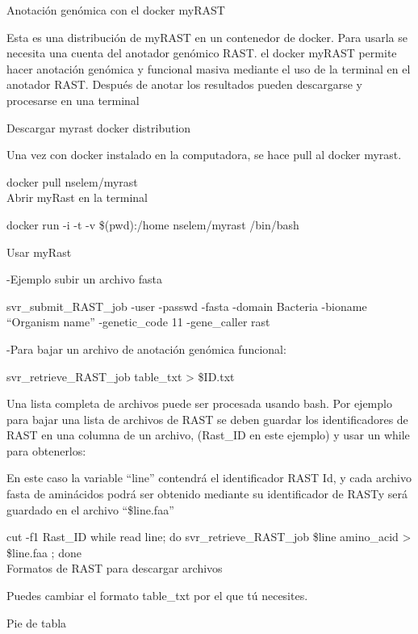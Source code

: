 \documentclass[12pt,twoside]{reedthesis}
\begin{document}
  Anotación genómica con el docker myRAST
  
  Esta es una distribución de myRAST en un contenedor de docker. Para
  usarla se necesita una cuenta del anotador genómico RAST. el docker
  myRAST permite hacer anotación genómica y funcional masiva mediante el
  uso de la terminal en el anotador RAST. Después de anotar los resultados
  pueden descargarse y procesarse en una terminal
  
  Descargar myrast docker distribution
  
  Una vez con docker instalado en la computadora, se hace pull al docker
  myrast.
  
  docker pull nselem/myrast\\
  Abrir myRast en la terminal
  
  docker run -i -t -v \$(pwd):/home nselem/myrast /bin/bash
  
  Usar myRast
  
  -Ejemplo subir un archivo fasta
  
  svr\_submit\_RAST\_job -user -passwd -fasta -domain Bacteria -bioname
  ``Organism name'' -genetic\_code 11 -gene\_caller rast
  
  -Para bajar un archivo de anotación genómica funcional:
  
  svr\_retrieve\_RAST\_job table\_txt \textgreater{} \$ID.txt
  
  Una lista completa de archivos puede ser procesada usando bash. Por
  ejemplo para bajar una lista de archivos de RAST se deben guardar los
  identificadores de RAST en una columna de un archivo, (Rast\_ID en este
  ejemplo) y usar un while para obtenerlos:
  
  En este caso la variable ``line'' contendrá el identificador RAST Id, y
  cada archivo fasta de aminácidos podrá ser obtenido mediante su
  identificador de RASTy será guardado en el archivo ``\$line.faa''
  
  cut -f1 Rast\_ID \textbar{} while read line; do svr\_retrieve\_RAST\_job
  \$line amino\_acid \textgreater{} \$line.faa ; done\\
  Formatos de RAST para descargar archivos
  
  Puedes cambiar el formato table\_txt por el que tú necesites.
  
  Pie de tabla
  
\end{document}
